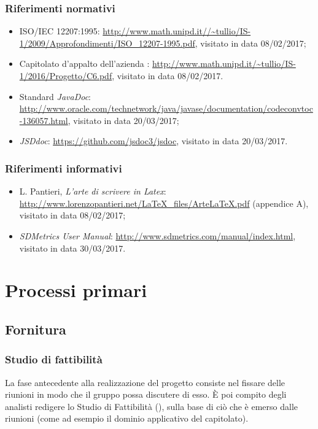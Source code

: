 \subsubsection{Riferimenti normativi}
\begin{itemize}
	\item ISO/IEC 12207:1995: \url{http://www.math.unipd.it//~tullio/IS-1/2009/Approfondimenti/ISO_12207-1995.pdf}, visitato in data 08/02/2017;
	\item Capitolato d'appalto dell'azienda \ZU: \url{http://www.math.unipd.it/~tullio/IS-1/2016/Progetto/C6.pdf}, visitato in data 08/02/2017.
	\item Standard \emph{JavaDoc}: \url{http://www.oracle.com/technetwork/java/javase/documentation/codeconvtoc-136057.html}, visitato in data 20/03/2017;
	\item {} \emph{JSDdoc}: \url{https://github.com/jsdoc3/jsdoc}, visitato in data 20/03/2017.
\end{itemize}

\subsubsection{Riferimenti informativi}
\begin{itemize}
	\item L. Pantieri, \emph{L'arte di scrivere in Latex}: \url{http://www.lorenzopantieri.net/LaTeX_files/ArteLaTeX.pdf} (appendice A), visitato in data 08/02/2017;
	\item \emph{SDMetrics User Manual}: \url{http://www.sdmetrics.com/manual/index.html}, visitato in data 30/03/2017.
\end{itemize}






\section{Processi primari} \label{sec:primari}


\subsection{Fornitura}

\subsubsection{Studio di fattibilità}
La fase antecedente alla realizzazione del progetto consiste nel fissare delle riunioni in modo che il gruppo possa discutere di esso. È poi compito degli analisti redigere lo Studio di Fattibilità (\SdF), sulla base di ciò che è emerso dalle riunioni (come ad esempio il dominio applicativo del capitolato).


